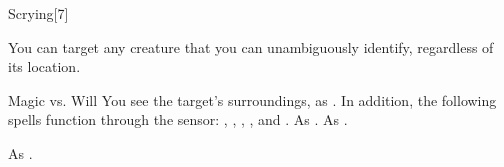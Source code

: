 \begin{spellsection}[Greater]{Scrying}[7]
    \begin{spellheader}
    \end{spellheader}
    \begin{spellcontent}
        \begin{spelltargetinginfo}
        \end{spelltargetinginfo}
        \begin{spelleffects}

            \spellspecial You can target any creature that you can unambiguously identify, regardless of its location.
            \begin{spellattack}{Magic vs. Will}
                \spellsuccess You see the target's surroundings, as . In addition, the following spells function through the sensor: , , , , and .
                \spellfailure As .
                \spellspecial As .
            \end{spellattack}
            \spelldur \durext \dismissable
        \end{spelleffects}
    \end{spellcontent}
    \begin{spellfooter}
        \spellnotes As .
    \end{spellfooter}
\end{spellsection}

